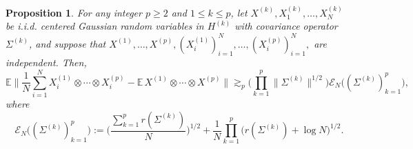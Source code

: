 \documentclass[numbers,webpdf,imaiai]{ima-authoring-template}
\theoremstyle{thmstyletwo}%
\newtheorem{proposition}[theorem]{Proposition}%
\numberwithin{equation}{section}
\numberwithin{equation}{section}
\newcommand{\E}{\mathbb{E}}
\begin{document}
\begin{proposition}\label{prop:lowerbound} For any integer $p\ge 2$ and $1 \leq k \leq p$, let $X^{(k)}, X_1^{(k)}, \ldots, X_N^{(k)}$ be i.i.d. centered Gaussian random variables in $H^{(k)}$ with covariance operator $\Sigma^{(k)}$, and suppose that $X^{(1)},\ldots, X^{(p)}, (X^{(1)}_i)_{i=1}^{N},\ldots,(X^{(p)}_i)_{i=1}^N,$ are independent. Then,
\[
\E \bigg\|\frac{1}{N} \sum_{i=1}^N X_i^{(1)} \otimes \cdots \otimes X_i^{(p)}-\E\, X^{(1)} \otimes \cdots \otimes X^{(p)}\bigg\| \gtrsim_p\bigg(\prod_{k=1}^p\|\Sigma^{(k)}\|^{1 / 2}\bigg)\mathscr{E}_N\big((\Sigma^{(k)})_{k=1}^p\big),
\]
where
\[
\mathscr{E}_N\big((\Sigma^{(k)})_{k=1}^p\big):= \bigg(\frac{\sum_{k=1}^p r(\Sigma^{(k)})}{N}\bigg)^{1/2}+\frac{1}{N}\prod_{k= 1}^{p}\Big(r(\Sigma^{(k)})+\log N\Big)^{1/2}.
\]
\end{proposition}
\end{document}
